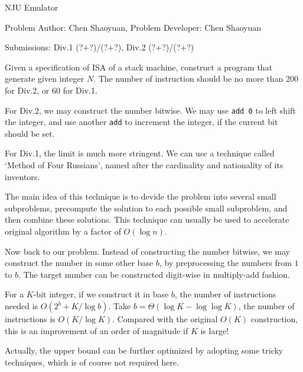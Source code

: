 \begin{Solution}{NJU Emulator}

\begin{frame}{\ProblemName}

\small Problem Author: Chen Shaoyuan, Problem Developer: Chen Shaoyuan \par \vspace{0.3cm}

\small Submissions: Div.1 (?+?)/(?+?), Div.2 (?+?)/(?+?)  \par \vspace{0.5cm}

Given a specification of ISA of a stack machine, construct a program that generate given integer $N$. The number of instruction should be no more than 200 for Div.2, or 60 for Div.1.

\pause

For Div.2, we may construct the number bitwise. We may use \texttt{add 0} to left shift the integer, and use another \texttt{add} to increment the integer, if the current bit should be set.

\end{frame}

\begin{frame}{\ProblemName}

For Div.1, the limit is much more stringent. We can use a technique called `Method of Four Russians', named after the cardinality and nationality of its inventors. 

\pause

The main idea of this technique is to devide the problem into several small subproblems, precompute the solution to each possible small subproblem, and then combine these solutions. This technique can usually be used to accelerate original algorithm by a factor of $O(\log n)$.

\end{frame}

\begin{frame}{\ProblemName}

Now back to our problem. Instead of constructing the number bitwise, we may construct the number in some other base $b$, by preprocessing the numbers from $1$ to $b$. The target number can be constructed digit-wise in multiply-add fashion. 

\pause

For a $K$-bit integer, if we construct it in base $b$, the number of instructions needed is $O(2^b + K / \log b)$. Take $b = \Theta(\log K - \log \log K)$, the number of instructions is $O(K / \log K)$. Compared with the original $O(K)$ construction, this is an improvement of an order of magnitude if $K$ is large!

\pause

Actually, the upper bound can be further optimized by adopting some tricky techniques, which is of course not required here.

\end{frame}

\end{Solution}
